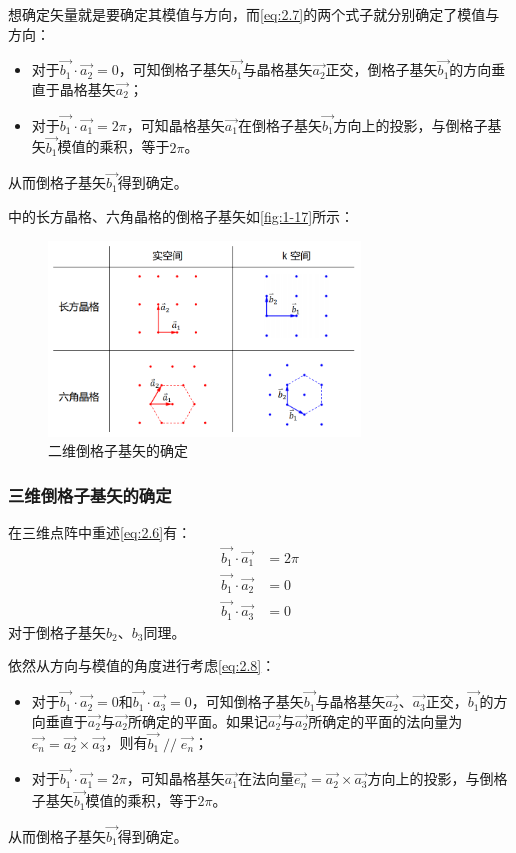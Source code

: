     想确定矢量就是要确定其模值与方向，而\autoref{eq:2.7}的两个式子就分别确定了模值与方向：
    \begin{itemize}[itemsep=0pt,parsep=0pt]
        \item 对于$\vec{b_1} \cdot \vec{a_2} = 0$，可知倒格子基矢$\vec{b_1}$与晶格基矢$\vec{a_2}$正交，倒格子基矢$\vec{b_1}$的方向垂直于晶格基矢$\vec{a_2}$；
        \item 对于$\vec{b_1} \cdot \vec{a_1} = 2\pi$，可知晶格基矢$\vec{a_1}$在倒格子基矢$\vec{b_1}$方向上的投影，与倒格子基矢$\vec{b_1}$模值的乘积，等于$2\pi$。
    \end{itemize}
    从而倒格子基矢$\vec{b_1}$得到确定。

    中的长方晶格、六角晶格的倒格子基矢如\autoref{fig:1-17}所示：
    \begin{figure}[!htbp]
        \centering    
        \includegraphics[height=14em, keepaspectratio=true]{pic/2-04}
        \caption{二维倒格子基矢的确定}
        \label{fig:1-17}
    \end{figure}

\subsubsection{三维倒格子基矢的确定}
    在三维点阵中重述\autoref{eq:2.6}有：
    \begin{subequations}\label{eq:2.8}
    \begin{align}
        \vec{b_1} \cdot \vec{a_1} &= 2\pi\\
        \vec{b_1} \cdot \vec{a_2} &= 0\\
        \vec{b_1} \cdot \vec{a_3} &= 0
    \end{align}
    \end{subequations}
    对于倒格子基矢$b_2$、$b_3$同理。

    依然从方向与模值的角度进行考虑\autoref{eq:2.8}：
    \begin{itemize}[itemsep=0pt,parsep=0pt]
        \item 对于$\vec{b_1} \cdot \vec{a_2} = 0$和$\vec{b_1} \cdot \vec{a_3} = 0$，可知倒格子基矢$\vec{b_1}$与晶格基矢$\vec{a_2}$、$\vec{a_3}$正交，$\vec{b_1}$的方向垂直于$\vec{a_2}$与$\vec{a_2}$所确定的平面。如果记$\vec{a_2}$与$\vec{a_2}$所确定的平面的法向量为$\vec{e_n}=\vec{a_2} \times \vec{a_3}$，则有$\vec{b_1}\mathop{//}\vec{e_n}$；
        \item 对于$\vec{b_1} \cdot \vec{a_1} = 2\pi$，可知晶格基矢$\vec{a_1}$在法向量$\vec{e_n}=\vec{a_2} \times \vec{a_3}$方向上的投影，与倒格子基矢$\vec{b_1}$模值的乘积，等于$2\pi$。
    \end{itemize}
    从而倒格子基矢$\vec{b_1}$得到确定。

